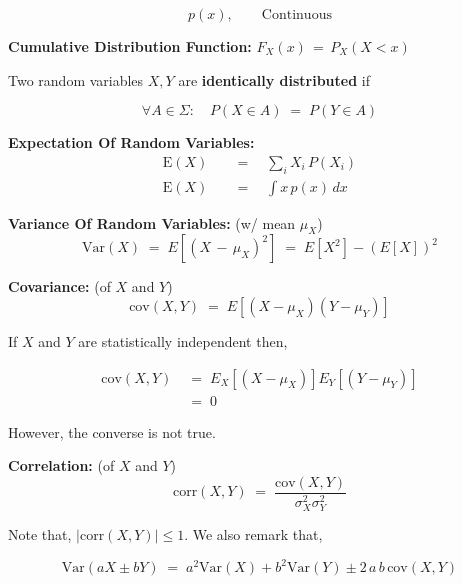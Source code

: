 \documentclass[10pt]{article}
\numberwithin{equation}{section}
\begin{document}
$$p(x), \qquad  \text{Continuous}$$ 

\vspace{2mm}

\noindent
\textbf{Cumulative Distribution Function:} $F_{X}(x) \, = \, P_{X}(X < x)$


\vspace{2mm}

\noindent
Two random variables $X, Y$ are \textbf{identically distributed} if 

$$\forall A \in \Sigma: \quad P(X \in A) \; = \; P(Y \in A)$$

\vspace{2mm}

\noindent
\textbf{Expectation Of Random Variables:}
\begin{align}
\text{E}(X) \quad &= \quad \sum_{i} X_{i} \, P(X_{i}) \\
\text{E}(X) \quad &= \quad \int x \, p(x) \,dx
\end{align} 

\vspace{2mm}

\noindent
\textbf{Variance Of Random Variables:} (w/ mean $\mu_{X}$)
\begin{equation}
\text{Var}(X) \; = \; E[(X  \, - \, \mu_{X})^{2}] \; = \; E[X^{2}] - \left(E[X]\right)^{2}
\end{equation}

\vspace{2mm}

\noindent
\textbf{Covariance:} (of $X$ and $Y$)
$$\text{cov}(X,Y) \; = \; E[(X - \mu_{X})(Y - \mu_{Y})] $$

\noindent
If $X$ and $Y$ are statistically independent then,

\begin{align} 
\text{cov}(X,Y) \; &= \; E_{X}[(X - \mu_{X})] E_{Y}[(Y - \mu_{Y})] \\ 
&= \; 0
\end{align}

\noindent
However, the converse is not true.

\vspace{2mm}

\noindent
\textbf{Correlation:} (of $X$ and $Y$)
$$\text{corr}(X,Y) \; = \;  \frac{\text{cov}(X,Y)}{\sigma_{X}^{2} \sigma_{Y}^{2}} $$

\noindent
Note that, $ \vert \text{corr}(X,Y) \vert  \leq 1 $. We also remark that,

$$ \text{Var}(aX \pm  bY ) \; = \; a^{2} \text{Var}(X) + b^{2}\text{Var}(Y) \pm  2 \, a \, b \,  \text{cov}(X,Y)$$
\end{document}
